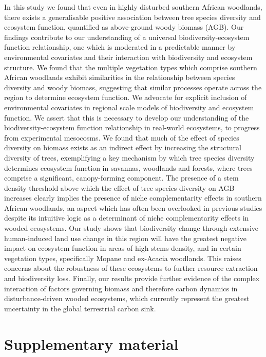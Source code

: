 \begin{refsection}
In this study we found that even in highly disturbed southern African woodlands, there exists a generalisable positive association between tree species diversity and ecosystem function, quantified as above-ground woody biomass (AGB). Our findings contribute to our understanding of a universal biodiversity-ecosystem function relationship, one which is moderated in a predictable manner by environmental covariates and their interaction with biodiversity and ecosystem structure. We found that the multiple vegetation types which comprise southern African woodlands exhibit similarities in the relationship between species diversity and woody biomass, suggesting that similar processes operate across the region to determine ecosystem function. We advocate for explicit inclusion of environmental covariates in regional scale models of biodiversity and ecosystem function. We assert that this is necessary to develop our understanding of the biodiversity-ecosystem function relationship in real-world ecosystems, to progress from experimental mesocosms. We found that much of the effect of species diversity on biomass exists as an indirect effect by increasing the structural diversity of trees, exemplifying a key mechanism by which tree species diversity determines ecosystem function in savannas, woodlands and forests, where trees comprise a significant, canopy-forming component. The presence of a stem density threshold above which the effect of tree species diversity on AGB increases clearly implies the presence of niche complementarity effects in southern African woodlands, an aspect which has often been overlooked in previous studies despite its intuitive logic as a determinant of niche complementarity effects in wooded ecosystems. Our study shows that biodiversity change through extensive human-induced land use change in this region will have the greatest negative impact on ecosystem function in areas of high stems density, and in certain vegetation types, specifically Mopane and ex-Acacia woodlands. This raises concerns about the robustness of these ecosystems to further resource extraction and biodiversity loss. Finally, our results provide further evidence of the complex interaction of factors governing biomass and therefore carbon dynamics in disturbance-driven wooded ecosystems, which currently represent the greatest uncertainty in the global terrestrial carbon sink.

\newpage{}
\FloatBarrier{}
\begingroup
{}
\printbibliography[heading=subbibintoc]
\endgroup

\section{Supplementary material}
\label{befr:sec:supp}


\end{refsection}
